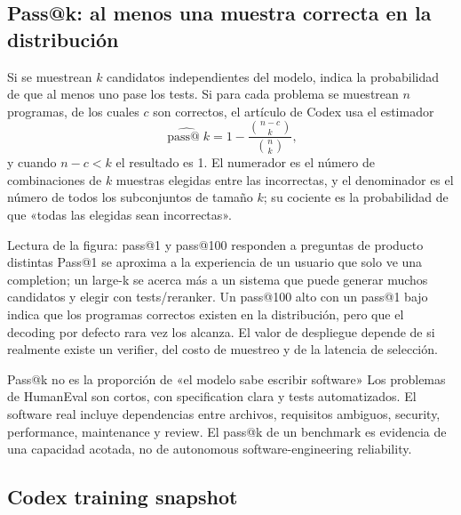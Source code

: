 \subsection{Pass@k: al menos una muestra correcta en la distribución}

Si se muestrean $k$ candidatos independientes del modelo,  indica la probabilidad de que al menos uno pase los tests. Si para cada problema se muestrean $n$ programas, de los cuales $c$ son correctos, el artículo de Codex usa el estimador
\[
\widehat{\operatorname{pass@}k}
=1-\frac{\binom{n-c}{k}}{\binom{n}{k}},
\]
y cuando $n-c<k$ el resultado es 1. El numerador es el número de combinaciones de $k$ muestras elegidas entre las incorrectas, y el denominador es el número de todos los subconjuntos de tamaño $k$; su cociente es la probabilidad de que «todas las elegidas sean incorrectas».


\begin{knowledgebox}{Lectura de la figura: pass@1 y pass@100 responden a preguntas de producto distintas}
Pass@1 se aproxima a la experiencia de un usuario que solo ve una completion; un large-k se acerca más a un sistema que puede generar muchos candidatos y elegir con tests/reranker. Un pass@100 alto con un pass@1 bajo indica que los programas correctos existen en la distribución, pero que el decoding por defecto rara vez los alcanza. El valor de despliegue depende de si realmente existe un verifier, del costo de muestreo y de la latencia de selección.
\end{knowledgebox}

\begin{warningbox}{Pass@k no es la proporción de «el modelo sabe escribir software»}
Los problemas de HumanEval son cortos, con specification clara y tests automatizados. El software real incluye dependencias entre archivos, requisitos ambiguos, security, performance, maintenance y review. El pass@k de un benchmark es evidencia de una capacidad acotada, no de autonomous software-engineering reliability.
\end{warningbox}

\subsection{Codex training snapshot}

